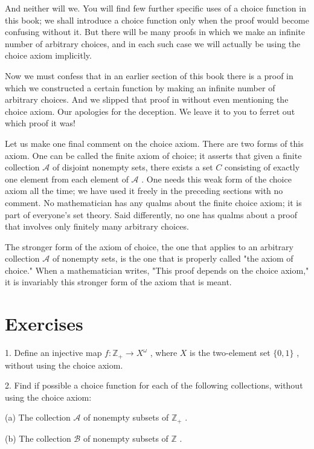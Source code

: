 And neither will we. You will find few further specific uses of a choice function in this book; we shall introduce a choice function only when the proof would become confusing without it. But there will be many proofs in which we make an infinite number of arbitrary choices, and in each such case we will actually be using the choice axiom implicitly.

Now we must confess that in an earlier section of this book there is a proof in which we constructed a certain function by making an infinite number of arbitrary choices. And we slipped that proof in without even mentioning the choice axiom. Our apologies for the deception. We leave it to you to ferret out which proof it was!

Let us make one final comment on the choice axiom. There are two forms of this axiom. One can be called the finite axiom of choice; it asserts that given a finite collection \(\mathcal{A}\) of disjoint nonempty sets, there exists a set \(C\) consisting of exactly one element from each element of \(\mathcal{A}\) . One needs this weak form of the choice axiom all the time; we have used it freely in the preceding sections with no comment. No mathematician has any qualms about the finite choice axiom; it is part of everyone's set theory. Said differently, no one has qualms about a proof that involves only finitely many arbitrary choices.

The stronger form of the axiom of choice, the one that applies to an arbitrary collection \(\mathcal{A}\) of nonempty sets, is the one that is properly called "the axiom of choice." When a mathematician writes, "This proof depends on the choice axiom," it is invariably this stronger form of the axiom that is meant.

\section*{Exercises}

1. Define an injective map \(f : {\mathbb{Z}}_{ + } \rightarrow  {X}^{\omega }\) , where \(X\) is the two-element set \(\{ 0,1\}\) , without using the choice axiom.

2. Find if possible a choice function for each of the following collections, without using the choice axiom:

(a) The collection \(\mathcal{A}\) of nonempty subsets of \({\mathbb{Z}}_{ + }\) .

(b) The collection \(\mathcal{B}\) of nonempty subsets of \(\mathbb{Z}\) .

